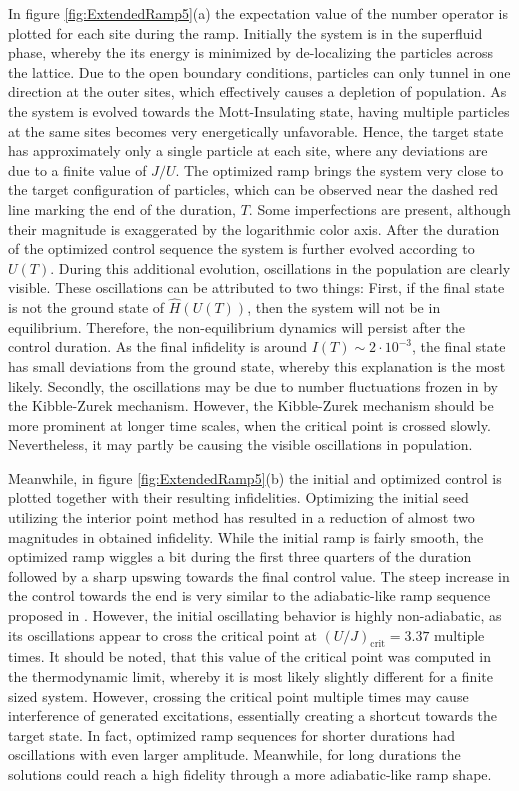 In figure \ref{fig:ExtendedRamp5}(a) the expectation value of the number operator is plotted for each site during the ramp. Initially the system is in the superfluid phase, whereby the its energy is minimized by de-localizing the particles across the lattice. Due to the open boundary conditions, particles can only tunnel in one direction at the outer sites, which effectively causes a depletion of population. 
As the system is evolved towards the Mott-Insulating state, having multiple particles at the same sites becomes very energetically unfavorable. Hence, the target state has approximately only a single particle at each site, where any deviations are due to a finite value of $J/U$.
The optimized ramp brings the system very close to the target configuration of particles, which can be observed near the dashed red line marking the end of the duration, $T$. Some imperfections are present, although their magnitude is exaggerated by the logarithmic color axis.
After the duration of the optimized control sequence the system is further evolved according to $U(T)$. During this additional evolution, oscillations in the population are clearly visible. These oscillations can be attributed to two things: First, if the final state is not the ground state of $\hat{H}(U(T))$, then the system will not be in equilibrium. Therefore, the non-equilibrium dynamics will persist after the control duration. As the final infidelity is around $I(T) \sim 2 \cdot 10^{-3}$, the final state has small deviations from the ground state, whereby this explanation is the most likely. 
Secondly, the oscillations may be due to number fluctuations frozen in by the Kibble-Zurek mechanism. However, the Kibble-Zurek mechanism should be more prominent at longer time scales, when the critical point is crossed slowly. Nevertheless, it may partly be causing the visible oscillations in population.

Meanwhile, in figure \ref{fig:ExtendedRamp5}(b) the initial and optimized control is plotted together with their resulting infidelities. Optimizing the initial seed utilizing the interior point method has resulted in a reduction of almost two magnitudes in obtained infidelity.
While the initial ramp is fairly smooth, the optimized ramp wiggles a bit during the first three quarters of the duration followed by a sharp upswing towards the final control value. The steep increase in the control towards the end is very similar to the adiabatic-like ramp sequence proposed in \cite{Zakrzewski2009}. However, the initial oscillating behavior is highly non-adiabatic, as its oscillations appear to cross the critical point at $(U/J)_{\mathrm{crit}} = 3.37$ multiple times. It should be noted, that this value of the critical point was computed in the thermodynamic limit, whereby it is most likely slightly different for a finite sized system. However, crossing the critical point multiple times may cause interference of generated excitations, essentially creating a shortcut towards the target state. 
In fact, optimized ramp sequences for shorter durations had oscillations with even larger amplitude. Meanwhile, for long durations the solutions could reach a high fidelity through a more adiabatic-like ramp shape.


